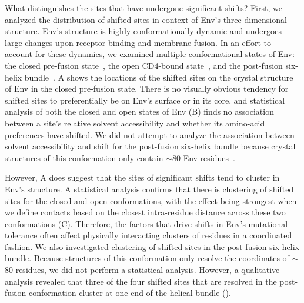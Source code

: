 \documentclass[9pt]{elife}
\begin{document}
What distinguishes the sites that have undergone significant shifts?
First, we analyzed the distribution of shifted sites in context of Env's three-dimensional structure.
Env's structure is highly conformationally dynamic and undergoes large changes upon receptor binding and membrane fusion.
In an effort to account for these dynamics, we examined multiple conformational states of Env: the closed pre-fusion state~\citep{stewart2016trimeric}, the open CD4-bound state~\citep{ozorowski2017open}, and the post-fusion six-helix bundle~\citep{weissenhorn1997atomic}.
A shows the locations of the shifted sites on the crystal structure of Env in the closed pre-fusion state.
There is no visually obvious tendency for shifted sites to preferentially be on Env's surface or in its core, and statistical analysis of both the closed and open states of Env (B) finds no association between a site's relative solvent accessibility and whether its amino-acid preferences have shifted.
We did not attempt to analyze the association between solvent accessibility and shift for the post-fusion six-helix bundle because crystal structures of this conformation only contain $\sim$80 Env residues~\citep{weissenhorn1997atomic,chan1997core,tan1997atomic}.

However, A does suggest that the sites of significant shifts tend to cluster in Env's structure.
A statistical analysis confirms that there is clustering of shifted sites for the closed and open conformations, with the effect being strongest when we define contacts based on the closest intra-residue distance across these two conformations  (C).
Therefore, the factors that drive shifts in Env's mutational tolerance often affect physically interacting clusters of residues in a coordinated fashion.
We also investigated clustering of shifted sites in the post-fusion six-helix bundle.
Because structures of this conformation only resolve the coordinates of $\sim$80 residues, we did not perform a statistical analysis.
However, a qualitative analysis revealed that three of the four shifted sites that are resolved in the post-fusion conformation cluster at one end of the helical bundle ().
\end{document}
